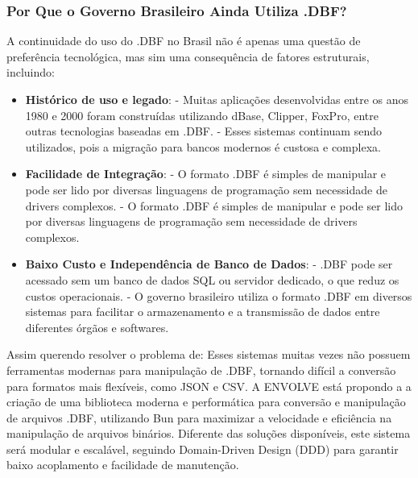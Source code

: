 \begin{titlepage}
    \subsubsection{Por Que o Governo Brasileiro Ainda Utiliza .DBF?}
    A continuidade do uso do .DBF no Brasil não é apenas uma questão de preferência tecnológica, mas sim uma consequência de fatores estruturais, incluindo:
    \begin{itemize}
        \item \textbf{Histórico de uso e legado}:
              \subitem - Muitas aplicações desenvolvidas entre os anos 1980 e 2000 foram construídas utilizando dBase, Clipper, FoxPro, entre outras tecnologias baseadas em .DBF.
              \subitem - Esses sistemas continuam sendo utilizados, pois a migração para bancos modernos é custosa e complexa.
        \item \textbf{Facilidade de Integração}:
              \subitem - O formato .DBF é simples de manipular e pode ser lido por diversas linguagens de programação sem necessidade de drivers complexos.
              \subitem - O formato .DBF é simples de manipular e pode ser lido por diversas linguagens de programação sem necessidade de drivers complexos.
        \item \textbf{Baixo Custo e Independência de Banco de Dados}:
              \subitem - .DBF pode ser acessado sem um banco de dados SQL ou servidor dedicado, o que reduz os custos operacionais.
              \subitem - O governo brasileiro utiliza o formato .DBF em diversos sistemas para facilitar o armazenamento e a transmissão de dados entre diferentes órgãos e softwares.
    \end{itemize}

    Assim querendo resolver o problema de: Esses sistemas muitas vezes não possuem
    ferramentas modernas para manipulação de .DBF, tornando difícil a conversão
    para formatos mais flexíveis, como JSON e CSV. A ENVOLVE está propondo a a
    criação de uma biblioteca moderna e performática para conversão e manipulação
    de arquivos .DBF, utilizando Bun para maximizar a velocidade e eficiência na
    manipulação de arquivos binários. Diferente das soluções disponíveis, este
    sistema será modular e escalável, seguindo Domain-Driven Design (DDD) para
    garantir baixo acoplamento e facilidade de manutenção.


\end{titlepage}
